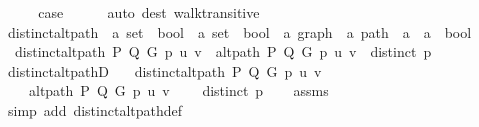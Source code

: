 \begin{isabellebody}
\ \ \isamarkupfalse%
\ \isamarkupfalse%
\ {\isacharquery}{\kern0pt}case\isanewline
\ \ \ \ \isamarkupfalse%
\ {\isacharparenleft}{\kern0pt}auto\ dest{\isacharcolon}{\kern0pt}\ walk{\isacharunderscore}{\kern0pt}transitive{\isacharparenright}{\kern0pt}\isanewline
{}\isamarkupfalse%
%
\endisatagproof
{\isafoldproof}%
%
\isadelimproof
\isanewline
%
\endisadelimproof
\isanewline
{}\isamarkupfalse%
\ distinct{\isacharunderscore}{\kern0pt}alt{\isacharunderscore}{\kern0pt}path\ {\isacharcolon}{\kern0pt}{\isacharcolon}{\kern0pt}\ {\isachardoublequoteopen}{\isacharparenleft}{\kern0pt}{\isacharprime}{\kern0pt}a\ set\ {\isasymRightarrow}\ bool{\isacharparenright}{\kern0pt}\ {\isasymRightarrow}\ {\isacharparenleft}{\kern0pt}{\isacharprime}{\kern0pt}a\ set\ {\isasymRightarrow}\ bool{\isacharparenright}{\kern0pt}\ {\isasymRightarrow}\ {\isacharprime}{\kern0pt}a\ graph\ {\isasymRightarrow}\ {\isacharprime}{\kern0pt}a\ path\ {\isasymRightarrow}\ {\isacharprime}{\kern0pt}a\ {\isasymRightarrow}\ {\isacharprime}{\kern0pt}a\ {\isasymRightarrow}\ bool{\isachardoublequoteclose}\ \isanewline
\ \ {\isachardoublequoteopen}distinct{\isacharunderscore}{\kern0pt}alt{\isacharunderscore}{\kern0pt}path\ P\ Q\ G\ p\ u\ v\ {\isasymequiv}\ alt{\isacharunderscore}{\kern0pt}path\ P\ Q\ G\ p\ u\ v\ {\isasymand}\ distinct\ p{\isachardoublequoteclose}\isanewline
%
\isadeliminvisible
\isanewline
%
\endisadeliminvisible
%
\isataginvisible
{}\isamarkupfalse%
\ distinct{\isacharunderscore}{\kern0pt}alt{\isacharunderscore}{\kern0pt}pathD{\isacharcolon}{\kern0pt}\isanewline
\ \ \ {\isachardoublequoteopen}distinct{\isacharunderscore}{\kern0pt}alt{\isacharunderscore}{\kern0pt}path\ P\ Q\ G\ p\ u\ v{\isachardoublequoteclose}\isanewline
\ \ \isanewline
\ \ \ \ {\isachardoublequoteopen}alt{\isacharunderscore}{\kern0pt}path\ P\ Q\ G\ p\ u\ v{\isachardoublequoteclose}\isanewline
\ \ \ \ {\isachardoublequoteopen}distinct\ p{\isachardoublequoteclose}%
\endisataginvisible
{\isafoldinvisible}%
%
\isadeliminvisible
\isanewline
%
\endisadeliminvisible
%
\isadelimproof
\ \ %
\endisadelimproof
%
\isatagproof
{}\isamarkupfalse%
\ assms\isanewline
\ \ \isamarkupfalse%
\ {\isacharparenleft}{\kern0pt}simp\ add{\isacharcolon}{\kern0pt}\ distinct{\isacharunderscore}{\kern0pt}alt{\isacharunderscore}{\kern0pt}path{\isacharunderscore}{\kern0pt}def{\isacharparenright}{\kern0pt}{\isacharplus}{\kern0pt}%
\endisatagproof
{\isafoldproof}%

\end{isabellebody}

